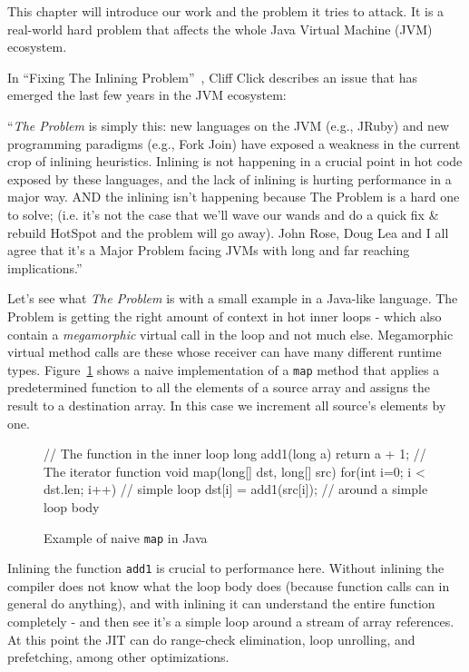 \label{introduction}
This chapter will introduce our work and the problem it tries to attack. It is a
real-world hard problem that affects the whole Java Virtual Machine (JVM) ecosystem.

In ``Fixing The Inlining Problem''~\cite{cliffc:TheProblem}, Cliff Click describes an issue
that has emerged the last few years in the JVM ecosystem:

``\emph{The Problem} is simply this: new languages on the JVM (e.g., JRuby) and new
programming paradigms (e.g., Fork Join) have exposed a weakness in the current
crop of inlining heuristics.  Inlining is not happening in a crucial point in
hot code exposed by these languages, and the lack of inlining is hurting
performance in a major way.  AND the inlining isn't happening because The
Problem is a hard one to solve; (i.e. it's not the case that we'll wave our
wands and do a quick fix \& rebuild HotSpot and the problem will go away).  
John Rose, Doug Lea and I all agree that it's a Major Problem facing JVMs with long
and far reaching implications.''

Let's see what \emph{The Problem} is with a small example in a Java-like language. The
Problem is getting the right amount of context in hot inner loops - which also
contain a \emph{megamorphic} virtual call in the loop and not much else. Megamorphic virtual method calls are these whose receiver can have many different runtime types. Figure~\ref{java_naive_map} 
shows a naive implementation of a \texttt{map} method that applies a predetermined
function to all the elements of a source array and assigns the result to a
destination array. In this case we increment all source's elements by one.

\begin{figure}
\begin{javaCode}
// The function in the inner loop
long add1(long a) {return a + 1;}
// The iterator function
void map(long[] dst, long[] src) {
  for(int i=0; i < dst.len; i++) // simple loop
    dst[i] = add1(src[i]); // around a simple loop body
}
\end{javaCode}
\caption[Example of naive \texttt{map} in Java]{Example of naive \texttt{map} in Java}
\label{java_naive_map}
\end{figure}

Inlining the function \texttt{add1} is crucial to performance here.  Without
inlining the compiler does not know what the loop body does (because function
calls can in general do anything), and with inlining it can understand the
entire function completely - and then see it's a simple loop around a stream of
array references.  At this point the JIT can do range-check elimination, loop
unrolling, and prefetching, among other optimizations.

